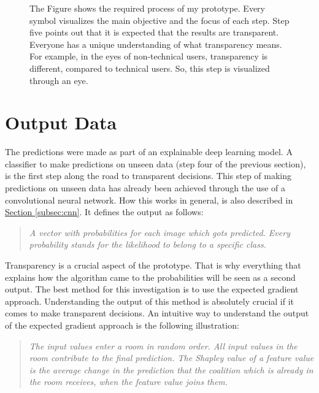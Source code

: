\begin{figure}[htp]
	\centering
	\caption{The Figure shows the required process of my prototype. Every symbol visualizes the main objective and the focus of each step.  Step five points out that it is expected that the results are transparent. Everyone has a unique understanding of what transparency means. For example, in the eyes of non-technical users, transparency is different, compared to technical users. So, this step is visualized through an eye. }
	\label{fig:45_Requirements_process}
\end{figure}

\section{Output Data}

The predictions were made as part of an explainable deep learning model. A classifier to make predictions on unseen data (step four of the previous section), is the first step along the road to transparent decisions. This step of making predictions on unseen data has already been achieved through the use of a convolutional neural network. How this works in general, is also described in \hyperref[subsec:cnn]{Section \ref{subsec:cnn}}. It defines the output as follows:

\begin{quote}
	\textit{A vector with probabilities for each image which gots predicted. Every probability stands for the likelihood to belong to a specific class.}
\end{quote}

Transparency is a crucial aspect of the prototype. That is why everything that explains how the algorithm came to the probabilities will be seen as a second output. The best method for this investigation is to use the expected gradient approach. Understanding the output of this method is absolutely crucial if it comes to make transparent decisions. An intuitive way to understand the output of the expected gradient approach is the following illustration: 

\begin{quote}
	\textit{The input values enter a room in random order. All input values in the room contribute to the final prediction. The Shapley value of a feature value is the average change in the prediction that the coalition which is already in the room receives, when the feature value joins them.}
\end{quote}

